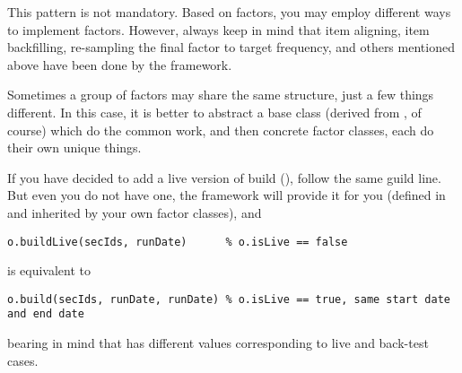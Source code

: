 This pattern is not mandatory. 
Based on factors, you may employ different ways to implement factors.
However, always keep in mind that item aligning, item backfilling,
re-sampling the final factor to target frequency,
and others mentioned above have been done by the framework.

Sometimes a group of factors may share the same structure, 
just a few things different.
In this case, it is better to abstract a base class (derived from , of course)
which do the common work,
and then concrete factor classes, each do their own unique things.

If you have decided to add a live version of build (),
follow the same guild line.
But even you do not have one,
the framework will provide it for you
(defined in  and inherited by your own factor classes),
and 
\begin{lstlisting}[numbers=none]
   o.buildLive(secIds, runDate)      % o.isLive == false
\end{lstlisting}
is equivalent to
\begin{lstlisting}[numbers=none]
   o.build(secIds, runDate, runDate) % o.isLive == true, same start date and end date
\end{lstlisting}
bearing in mind that  has different values corresponding to live and back-test cases.

% 
  
